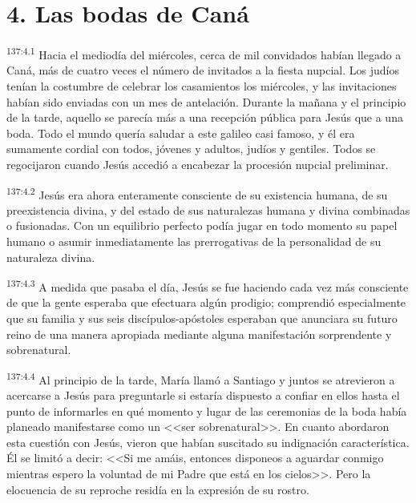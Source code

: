 \section*{4. Las bodas de Caná}
\par 
\textsuperscript{137:4.1} Hacia el mediodía del miércoles, cerca de mil convidados habían llegado a Caná, más de cuatro veces el número de invitados a la fiesta nupcial. Los judíos tenían la costumbre de celebrar los casamientos los miércoles, y las invitaciones habían sido enviadas con un mes de antelación. Durante la mañana y el principio de la tarde, aquello se parecía más a una recepción pública para Jesús que a una boda. Todo el mundo quería saludar a este galileo casi famoso, y él era sumamente cordial con todos, jóvenes y adultos, judíos y gentiles. Todos se regocijaron cuando Jesús accedió a encabezar la procesión nupcial preliminar.

\par 
\textsuperscript{137:4.2} Jesús era ahora enteramente consciente de su existencia humana, de su preexistencia divina, y del estado de sus naturalezas humana y divina combinadas o fusionadas. Con un equilibrio perfecto podía jugar en todo momento su papel humano o asumir inmediatamente las prerrogativas de la personalidad de su naturaleza divina.

\par 
\textsuperscript{137:4.3} A medida que pasaba el día, Jesús se fue haciendo cada vez más consciente de que la gente esperaba que efectuara algún prodigio; comprendió especialmente que su familia y sus seis discípulos-apóstoles esperaban que anunciara su futuro reino de una manera apropiada mediante alguna manifestación sorprendente y sobrenatural.

\par 
\textsuperscript{137:4.4} Al principio de la tarde, María llamó a Santiago y juntos se atrevieron a acercarse a Jesús para preguntarle si estaría dispuesto a confiar en ellos hasta el punto de informarles en qué momento y lugar de las ceremonias de la boda había planeado manifestarse como un <<ser sobrenatural>>. En cuanto abordaron esta cuestión con Jesús, vieron que habían suscitado su indignación característica. Él se limitó a decir: <<Si me amáis, entonces disponeos a aguardar conmigo mientras espero la voluntad de mi Padre que está en los cielos>>. Pero la elocuencia de su reproche residía en la expresión de su rostro.

